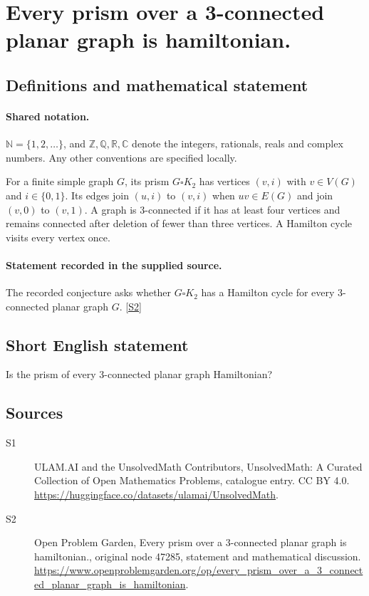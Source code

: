 \documentclass[11pt]{article}
\newcommand{\sref}[2]{\hyperlink{source:#1:#2}{[S#2]}}
\begin{document}
\section{Every prism over a 3-connected planar graph is hamiltonian.}\label{statement}

\subsection{Definitions and mathematical statement}

\paragraph{Shared notation.}$\mathbb N=\{1,2,\ldots\}$, and $\mathbb Z,\mathbb Q,\mathbb R,\mathbb C$ denote the integers, rationals, reals and complex numbers. Any other conventions are specified locally.


For a finite simple graph $G$, its prism $G\square K_2$ has vertices $(v,i)$ with $v\in V(G)$ and $i\in\{0,1\}$. Its edges join $(u,i)$ to $(v,i)$ when $uv\in E(G)$ and join $(v,0)$ to $(v,1)$. A graph is $3$-connected if it has at least four vertices and remains connected after deletion of fewer than three vertices. A Hamilton cycle visits every vertex once.
\paragraph{Statement recorded in the supplied source.}
The recorded conjecture asks whether $G\square K_2$ has a Hamilton cycle for every $3$-connected planar graph $G$. \sref{statement}{2}
\subsection{Short English statement}
Is the prism of every 3-connected planar graph Hamiltonian?
\subsection{Sources}
\begin{description}
\item[\hypertarget{source:statement:1}{S1}] ULAM.AI and the UnsolvedMath Contributors, UnsolvedMath: A Curated Collection of Open Mathematics Problems, catalogue entry. CC BY 4.0. \url{https://huggingface.co/datasets/ulamai/UnsolvedMath}.
\item[\hypertarget{source:statement:2}{S2}] Open Problem Garden, Every prism over a 3-connected planar graph is hamiltonian., original node 47285, statement and mathematical discussion. \url{https://www.openproblemgarden.org/op/every_prism_over_a_3_connected_planar_graph_is_hamiltonian}.
\end{description}
\label{end:statement}
\end{document}
